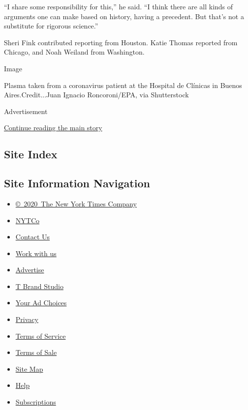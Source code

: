 ``I share some responsibility for this,'' he said. ``I think there are
all kinds of arguments one can make based on history, having a
precedent. But that's not a substitute for rigorous science.''

Sheri Fink contributed reporting from Houston. Katie Thomas reported
from Chicago, and Noah Weiland from Washington.

Image

Plasma taken from a coronavirus patient at the Hospital de Clínicas in
Buenos Aires.Credit...Juan Ignacio Roncoroni/EPA, via Shutterstock

Advertisement

\protect\hyperlink{after-bottom}{Continue reading the main story}

\hypertarget{site-index}{%
\subsection{Site Index}\label{site-index}}

\hypertarget{site-information-navigation}{%
\subsection{Site Information
Navigation}\label{site-information-navigation}}

\begin{itemize}
\tightlist
\item
  \href{https://help.nytimes.com/hc/en-us/articles/115014792127-Copyright-notice}{©~2020~The
  New York Times Company}
\end{itemize}

\begin{itemize}
\tightlist
\item
  \href{https://www.nytco.com/}{NYTCo}
\item
  \href{https://help.nytimes.com/hc/en-us/articles/115015385887-Contact-Us}{Contact
  Us}
\item
  \href{https://www.nytco.com/careers/}{Work with us}
\item
  \href{https://nytmediakit.com/}{Advertise}
\item
  \href{http://www.tbrandstudio.com/}{T Brand Studio}
\item
  \href{https://www.nytimes.com/privacy/cookie-policy\#how-do-i-manage-trackers}{Your
  Ad Choices}
\item
  \href{https://www.nytimes.com/privacy}{Privacy}
\item
  \href{https://help.nytimes.com/hc/en-us/articles/115014893428-Terms-of-service}{Terms
  of Service}
\item
  \href{https://help.nytimes.com/hc/en-us/articles/115014893968-Terms-of-sale}{Terms
  of Sale}
\item
  \href{https://spiderbites.nytimes.com}{Site Map}
\item
  \href{https://help.nytimes.com/hc/en-us}{Help}
\item
  \href{https://www.nytimes.com/subscription?campaignId=37WXW}{Subscriptions}
\end{itemize}
